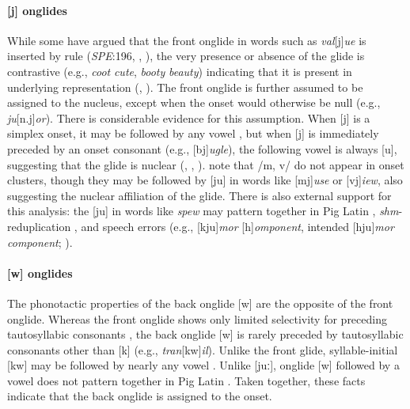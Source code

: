 \paragraph{[j] onglides} While some have argued that the front onglide in words such as \emph{val}[j]\emph{ue} is inserted by rule (\emph{SPE}:196, \citealp[][89]{Halle1985a}, \citealp[][217]{McMahon1990}), the very presence or absence of the glide is contrastive (e.g., \emph{coot} \alt{} \emph{cute}, \emph{booty} \alt{} \emph{beauty}) indicating that it is present in underlying representation (\citealp{Anderson1988b}, \citealp[278]{Borowsky1986}). The front onglide is further assumed to be assigned to the nucleus, except when the onset would otherwise be null (e.g., \emph{ju}[n.j]\emph{or}). There is considerable evidence for this assumption. When [j] is a simplex onset, it may be followed by any vowel \citep[][276]{Borowsky1986}, but when [j] is immediately preceded by an onset consonant (e.g., [bj]\emph{ugle}), the following vowel is always [u], suggesting that the glide is nuclear (\citealp{Davis1995}, \citealp[][61f.]{Harris1994}, \citealp[][232]{Hayes1980}). \citet[][42]{Clements1983} note that /m, v/ do not appear in onset clusters, though they may be followed by [ju] in words like [mj]\emph{use} or [vj]\emph{iew}, also suggesting the nuclear affiliation of the glide. There is also external support for this analysis: the [ju] in words like \emph{spew} may pattern together in Pig Latin \citep{Davis1995,Idsardi2005}, \emph{shm}-reduplication \citep{Nevins2003}, and speech errors (e.g., [kju]\emph{mor} [h]\emph{omponent}, intended [hju]\emph{mor component}; \citealp[130]{Shattuck-Hufnagel1986}).

\paragraph{[w] onglides} The phonotactic properties of the back onglide [w] are the opposite of the front onglide. Whereas the front onglide shows only limited selectivity for preceding tautosyllabic consonants \citep{Davis1995,Kaye1996}, the back onglide [w] is rarely preceded by tautosyllabic consonants other than [k] (e.g., \emph{tran}[kw]\emph{il}). Unlike the front glide, syllable-initial [kw] may be followed by nearly any vowel \citep[161]{Davis1995}. Unlike [juː], onglide [w] followed by a vowel does not pattern together in Pig Latin \citep[166]{Davis1995}. Taken together, these facts indicate that the back onglide is assigned to the onset.

